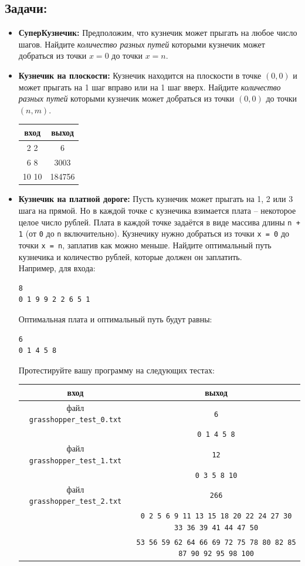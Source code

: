 \documentclass{article}
\begin{document}
\subsection*{Задачи:}
\begin{itemize}
\item \textbf{СуперКузнечик:} Предположим, что кузнечик может прыгать на любое число шагов. Найдите \textit{количество разных путей} которыми кузнечик может добраться из точки $x = 0$ до точки $x = n$.

\item \textbf{Кузнечик на плоскости:} Кузнечик находится на плоскости в точке $(0, 0)$ и может прыгать на 1 шаг вправо или на 1 шаг вверх. Найдите \textit{количество разных путей} которыми кузнечик может добраться из точки $(0, 0)$ до точки $(n, m)$.
\begin{center}
\begin{tabular}{ c | c }
 вход & выход \\ \hline
 2 2 & 6  \\ 
 6 8 & 3003  \\ 
 10 10 & 184756  \\ 
\end{tabular}
\end{center}

\item \textbf{Кузнечик на платной дороге:} Пусть кузнечик может прыгать на 1, 2 или 3 шага на прямой. Но в каждой точке с кузнечика взимается плата -- некоторое целое число рублей. Плата в каждой точке задаётся в виде массива длины \texttt{n + 1} (от \texttt{0} до \texttt{n} включительно). Кузнечику нужно добраться из точки \texttt{x = 0} до точки \texttt{x = n}, заплатив как можно меньше. Найдите оптимальный путь кузнечика и количество рублей, которые должен он заплатить.\\
Например, для входа:
\begin{verbatim}
8
0 1 9 9 2 2 6 5 1
\end{verbatim}
Оптимальная плата и оптимальный путь будут равны:
\begin{verbatim}
6
0 1 4 5 8
\end{verbatim}
Протестируйте вашу программу на следующих тестах:
\begin{center}
\begin{tabular}{ c | c }
 вход & выход \\ \hline
 файл \texttt{grasshopper\_test\_0.txt} & \texttt{6}  \\
 										& \texttt{0 1 4 5 8}\\
 файл \texttt{grasshopper\_test\_1.txt} & \texttt{12}  \\
 										& \texttt{0 3 5 8 10}\\
 файл \texttt{grasshopper\_test\_2.txt} & \texttt{266}  \\
 										& \texttt{0 2 5 6 9 11 13 15 18 20 22 24 27 30 33 36 39 41 44 47 50}\\
 										& \texttt{53 56 59 62 64 66 69 72 75 78 80 82 85 87 90 92 95 98 100}\\
\end{tabular}
\end{center}
\end{itemize}
\end{document}
